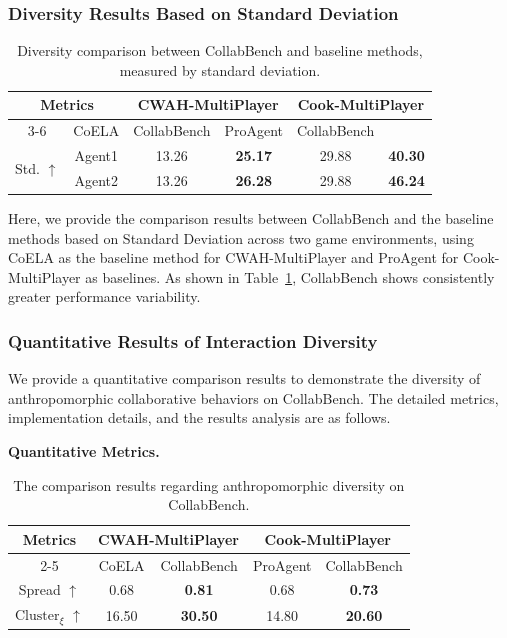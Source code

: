 \documentclass{article}
\theoremstyle{plain}
\theoremstyle{definition}
\theoremstyle{remark}
\begin{document}
\subsubsection{Diversity Results Based on Standard Deviation}\label{apx:stand}
\begin{table}[htbp]
  \centering
  \caption{Diversity comparison between CollabBench and baseline methods, measured by standard deviation.}

    \begin{tabular}{c|c|cc|cc}
    \toprule
    \multicolumn{2}{c|}{\multirow{2}[4]{*}{Metrics}} & \multicolumn{2}{c|}{CWAH-MultiPlayer} & \multicolumn{2}{c}{Cook-MultiPlayer} \\
\cmidrule{3-6}    \multicolumn{2}{c|}{} & CoELA & CollabBench & ProAgent & CollabBench \\
    \midrule
    \multirow{2}[2]{*}{Std. $\uparrow$} & Agent1 & 13.26 & \textbf{25.17} & 29.88 & \textbf{40.30} \\
          & Agent2 & 13.26 & \textbf{26.28} & 29.88 & \textbf{46.24} \\
    \bottomrule
    \end{tabular}%
  \label{apx:tab:anth_std_diver}%
\end{table}%
Here, we provide the comparison results between CollabBench and the baseline methods based on Standard Deviation across two game environments, using CoELA as the baseline method for CWAH-MultiPlayer and ProAgent for Cook-MultiPlayer as baselines. As shown in Table~\ref{apx:tab:anth_std_diver}, CollabBench shows consistently greater performance variability.

\subsubsection{Quantitative Results of Interaction Diversity}\label{apx:diver_quant}
We provide a quantitative comparison results to demonstrate the diversity of anthropomorphic collaborative behaviors on CollabBench. The detailed metrics, implementation details, and the results analysis are as follows.



\textbf{Quantitative Metrics.}

\begin{table}[htbp]
  \centering
  \caption{The comparison results regarding anthropomorphic diversity on CollabBench.}

    \begin{tabular}{c|cc|cc}
    \toprule
    \multirow{2}[4]{*}{\textbf{Metrics}} & \multicolumn{2}{c|}{\textbf{CWAH-MultiPlayer}} & \multicolumn{2}{c}{\textbf{Cook-MultiPlayer}} \\
\cmidrule{2-5}          & CoELA & CollabBench & ProAgent & CollabBench \\
    \midrule
    Spread $\uparrow$& 0.68  & \textbf{0.81} & 0.68  & \textbf{0.73} \\
    $\text{Cluster}_\xi$ $\uparrow$& 16.50 & \textbf{30.50} & 14.80 & \textbf{20.60} \\
    \bottomrule
    \end{tabular}
  \label{apx:tab:diver}%
\end{table}%
\end{document}
